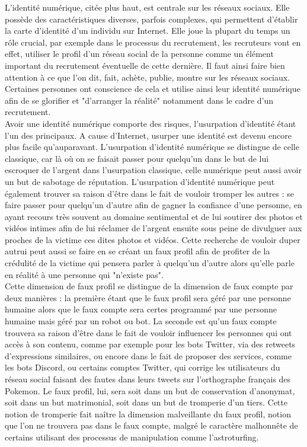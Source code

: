 \documentclass[12pt]{report}
\begin{document}
L'identité numérique, citée plus haut, est centrale sur les réseaux sociaux. Elle possède des caractéristiques diverses, parfois complexes, qui permettent d'établir la carte d'identité d'un individu sur Internet. Elle joue la plupart du temps un rôle crucial, par exemple dans le processus du recrutement, les recruteurs vont en effet, utiliser le profil d'un réseau social de la personne comme un élément important du recrutement éventuelle de cette dernière. Il faut ainsi faire bien attention à ce que l'on dit, fait, achète, publie, montre sur les réseaux sociaux. Certaines personnes ont conscience de cela et utilise ainsi leur identité numérique afin de se glorifier et "d'arranger la réalité" notamment dans le cadre d'un recrutement.\\

Avoir une identité numérique comporte des risques, l'usurpation d'identité étant l'un des principaux. A cause d'Internet, usurper une identité est devenu encore plus facile qu'auparavant. L'usurpation d'identité numérique se distingue de celle classique, car là où on se faisait passer pour quelqu'un dans le but de lui escroquer de l'argent dans l'usurpation classique, celle numérique peut aussi avoir un but de sabotage de réputation. L'usurpation d'identité numérique peut également trouver sa raison d'être dans le fait de vouloir tromper les autres : se faire passer pour quelqu'un d'autre afin de gagner la confiance d'une personne, en ayant recours très souvent au domaine sentimental et de lui soutirer des photos et vidéos intimes afin de lui réclamer de l'argent ensuite sous peine de divulguer aux proches de la victime ces dites photos et vidéos. Cette recherche de vouloir duper autrui peut aussi se faire en se créant un faux profil afin de profiter de la crédulité de la victime qui pensera parler à quelqu'un d'autre alors qu'elle parle en réalité à une personne qui "n'existe pas".\\

Cette dimension de faux profil se distingue de la dimension de faux compte par deux manières : la première étant que le faux profil sera géré par une personne humaine alors que le faux compte sera certes programmé par une personne humaine mais géré par un robot ou bot. La seconde est qu'un faux compte trouvera sa raison d'être dans le fait de vouloir influencer les personnes qui ont accès à son contenu, comme par exemple pour les bots Twitter, via des retweets d'expressions similaires, ou encore dans le fait de proposer des services, comme les bots Discord, ou certains comptes Twitter, qui corrige les utilisateurs du réseau social faisant des fautes dans leurs tweets sur l'orthographe français des Pokemon. Le faux profil, lui, sera soit dans un but de conservation d'anonymat, soit dans un but matrimonial, soit dans un but de tromperie d'un tiers. Cette notion de tromperie fait naître la dimension malveillante du faux profil, notion que l'on ne trouvera pas dans le faux compte, malgré le caractère malhonnête de certains utilisant des processus de manipulation comme l'astroturfing.\\
\end{document}
